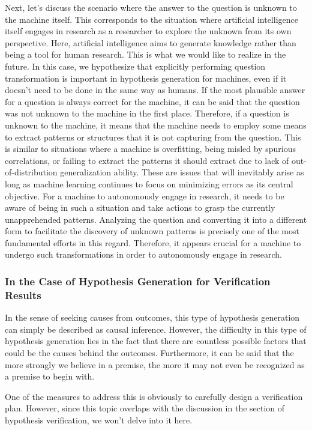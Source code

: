 \documentclass{book}
\begin{document}
Next, let's discuss the scenario where the answer to the question is unknown to the machine itself. This corresponds to the situation where artificial intelligence itself engages in research as a researcher to explore the unknown from its own perspective. Here, artificial intelligence aims to generate knowledge rather than being a tool for human research. This is what we would like to realize in the future. In this case, we hypothesize that explicitly performing question transformation is important in hypothesis generation for machines, even if it doesn't need to be done in the same way as humans. If the most plausible answer for a question is always correct for the machine, it can be said that the question was not unknown to the machine in the first place. Therefore, if a question is unknown to the machine, it means that the machine needs to employ some means to extract patterns or structures that it is not capturing from the question. This is similar to situations where a machine is overfitting, being misled by spurious correlations, or failing to extract the patterns it should extract due to lack of out-of-distribution generalization ability. These are issues that will inevitably arise as long as machine learning continues to focus on minimizing errors as its central objective. For a machine to autonomously engage in research, it needs to be aware of being in such a situation and take actions to grasp the currently unapprehended patterns. Analyzing the question and converting it into a different form to facilitate the discovery of unknown patterns is precisely one of the most fundamental efforts in this regard. Therefore, it appears crucial for a machine to undergo such transformations in order to autonomously engage in research.

\subsubsection{In the Case of Hypothesis Generation for Verification Results}
In the sense of seeking causes from outcomes, this type of hypothesis generation can simply be described as causal inference. However, the difficulty in this type of hypothesis generation lies in the fact that there are countless possible factors that could be the causes behind the outcomes. Furthermore, it can be said that the more strongly we believe in a premise, the more it may not even be recognized as a premise to begin with.

One of the measures to address this is obviously to carefully design a verification plan. However, since this topic overlaps with the discussion in the section of hypothesis verification, we won't delve into it here.
\end{document}
